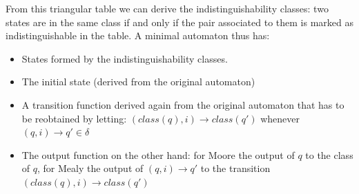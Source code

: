\documentclass{scrartcl}
\begin{document}
    From this triangular table we can derive the indistinguishability classes: two states are in the same class if and only if the pair associated to them is marked as indistinguishable in the table.
    A minimal automaton thus has:
    \begin{itemize}
        \item States formed by the indistinguishability classes.
        \item The initial state (derived from the original automaton)
        \item A transition function derived again from the original automaton that has to be reobtained by letting: $(class(q),i)\to class(q')$ whenever $(q,i)\to q'\in\delta$
        \item The output function on the other hand: for Moore the output of $q$ to the class of $q$, for Mealy the output of $(q,i)\to q'$ to the transition $(class(q),i)\to class(q')$
    \end{itemize}
\end{document}
